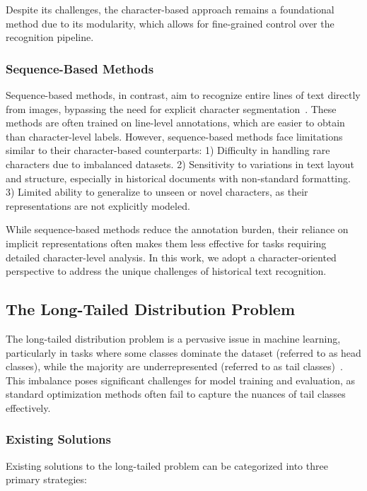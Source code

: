 Despite its challenges, the character-based approach remains a foundational method due to its modularity, which allows for fine-grained control over the recognition pipeline. 

\subsubsection{Sequence-Based Methods}

Sequence-based methods, in contrast, aim to recognize entire lines of text directly from images, bypassing the need for explicit character segmentation~\cite{eccvfork,jinic21}. These methods are often trained on line-level annotations, which are easier to obtain than character-level labels. However, sequence-based methods face limitations similar to their character-based counterparts:
1) Difficulty in handling rare characters due to imbalanced datasets.
2) Sensitivity to variations in text layout and structure, especially in historical documents with non-standard formatting.
3) Limited ability to generalize to unseen or novel characters, as their representations are not explicitly modeled.

While sequence-based methods reduce the annotation burden, their reliance on implicit representations often makes them less effective for tasks requiring detailed character-level analysis. In this work, we adopt a character-oriented perspective to address the unique challenges of historical text recognition.

\subsection{The Long-Tailed Distribution Problem}

The long-tailed distribution problem is a pervasive issue in machine learning, particularly in tasks where some classes dominate the dataset (referred to as head classes), while the majority are underrepresented (referred to as tail classes)~\cite{tailsurvey}. This imbalance poses significant challenges for model training and evaluation, as standard optimization methods often fail to capture the nuances of tail classes effectively.

\subsubsection{Existing Solutions}

Existing solutions to the long-tailed problem can be categorized into three primary strategies:


